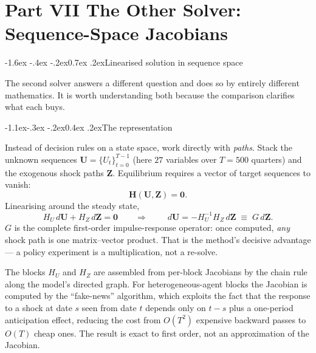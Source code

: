 \documentclass[10pt,a4paper]{article}
\makeatletter
\theoremstyle{definition}
\theoremstyle{plain}
\theoremstyle{remark}
\renewcommand\section{\@startsection{section}{1}{\z@}%
  {-1.6ex \@plus -.4ex \@minus -.2ex}{0.7ex \@plus.2ex}{\normalfont\large\bfseries}}
\renewcommand\subsection{\@startsection{subsection}{2}{\z@}%
  {-1.1ex\@plus -.3ex \@minus -.2ex}{0.4ex \@plus .2ex}{\normalfont\normalsize\bfseries}}
\makeatother
\begin{document}
\vspace{-4pt}\part*{Part VII \quad The Other Solver: Sequence-Space Jacobians}
\section{Linearised solution in sequence space}

The second solver answers a different question and does so by entirely different mathematics.
It is worth understanding both because the comparison clarifies what each buys.

\subsection{The representation}

Instead of decision rules on a state space, work directly with \emph{paths}. Stack the
unknown sequences $\mathbf{U} = \{U_t\}_{t=0}^{T-1}$ (here $27$ variables over $T=500$
quarters) and the exogenous shock paths $\mathbf{Z}$. Equilibrium requires a vector of target
sequences to vanish:
\begin{equation}
  \mathbf{H}(\mathbf{U},\mathbf{Z}) = \bm 0 .
\end{equation}
Linearising around the steady state,
\begin{equation}
  H_U\,d\mathbf{U} + H_Z\,d\mathbf{Z} = \bm 0
  \qquad\Longrightarrow\qquad
  \boxed{\;d\mathbf{U} = -H_U^{-1}H_Z\,d\mathbf{Z} \;\equiv\; G\,d\mathbf{Z}.}
  \label{eq:G}
\end{equation}
$G$ is the complete first-order impulse-response operator: once computed, \emph{any} shock path
is one matrix--vector product. That is the method's decisive advantage --- a policy experiment
is a multiplication, not a re-solve.

The blocks $H_U$ and $H_Z$ are assembled from per-block Jacobians by the chain rule along the
model's directed graph. For heterogeneous-agent blocks the Jacobian is computed by the
``fake-news'' algorithm, which exploits the fact that the response to a shock at date $s$ seen
from date $t$ depends only on $t-s$ plus a one-period anticipation effect, reducing the cost
from $O(T^2)$ expensive backward passes to $O(T)$ cheap ones. The result is exact to first
order, not an approximation of the Jacobian.
\end{document}
